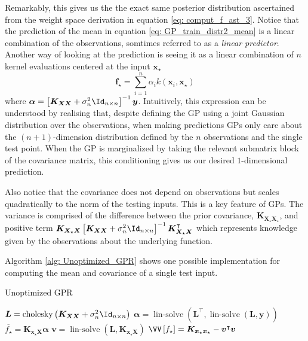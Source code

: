 Remarkably, this gives us the the exact same posterior distribution ascertained from the weight space derivation in equation \ref{eq: comput_f_ast_3}. Notice that the prediction of the mean in equation \ref{eq: GP_train_distr2_mean} is a linear combination of the observations, somtimes referred to as a {\it linear predictor}. Another way of looking at the prediction is seeing it as a linear combination of $n$ kernel evaluations centered at the input $\bm{x}_{\star}$
\[
    \bm{f}_{\star} = \sum_{i=1}^{n} \alpha_i k \left( \bm{x}_i , \bm{x}_{\star} \right)
\]
where $\bm{\alpha} = \left[ \bm{K_{XX}} + \sigma_n^2 \Id_{n \times n} \right]^{-1} \bm{y}$. Intuitively, this expression can be understood by realising that, despite defining the GP using a joint Gaussian distribution over the observations, when making predictions GPs only care about the $(n+1)$-dimension distribution defined by the $n$ observations and the single test point. When the GP is marginalized by taking the relevant submatrix block of the covariance matrix, this conditioning gives us our desired $1$-dimensional prediction.

Also notice that the covariance does not depend on observations but scales quadratically to the norm of the testing inputs. This is a key feature of GPs. The variance is comprised of the difference between the prior covariance, $\bm{K_{X_{\star}X_{\star}}}$, and positive term $\bm{K_{X_{\star}X}} \left[ \bm{K_{XX}} + \sigma_n^2 \Id_{n \times n} \right]^{-1} \bm{K_{X_{\star}X}}^{\intercal}$ which represents knowledge given by the observations about the underlying function.

Algorithm \ref{alg: Unoptimized_GPR} shows one possible implementation for computing the mean and covariance of a single test input.

\setcounter{GPRcount}{\value{algocf}}
{\centering
    \begin{minipage}{.85\linewidth}
        \begin{algorithm}[H]
            \caption{Unoptimized GPR}
            \label{alg: Unoptimized_GPR}
            \SetAlgoLined
            \DontPrintSemicolon

            \BlankLine
            $\bm{L} = \operatorname{cholesky} \left( \bm{K_{XX}} + \sigma_n^2 \Id_{n \times n} \right)$\;
            $\bm{\alpha} = \operatorname{lin-solve} \left( \bm{L}^{\intercal} , \operatorname{lin-solve} \left( \bm{L}, \bm{y} \right) \right)$\;
            $\overline{f_{\star}} = \bm{K_{x_{\star} X}} \bm{\alpha}$\;
            $\bm{v} = \operatorname{lin-solve} \left( \bm{L}, \bm{K_{x_{\star} X}} \right)$\;
            $\VV \left[ f_{\star} \right] = \bm{K_{x_{\star} x_{\star}}} - \bm{v}^{\intercal} \bm{v}$\;
            \BlankLine
        \end{algorithm}
    \end{minipage}
    \par
}

